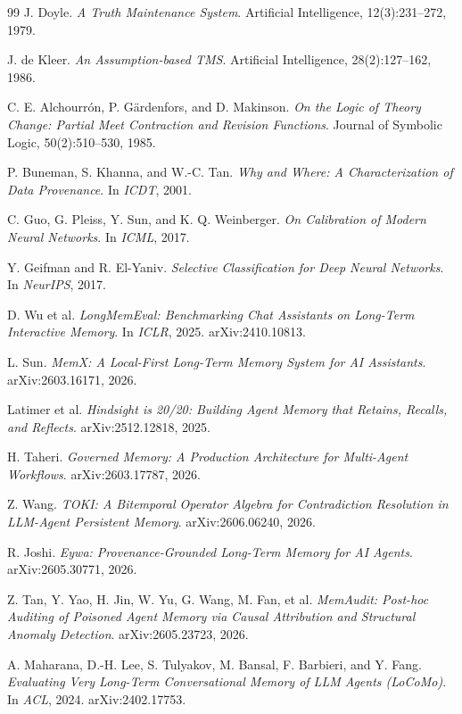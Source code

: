 \documentclass[11pt]{article}
\theoremstyle{definition}
\begin{document}
\begin{thebibliography}{99}
 J. Doyle. \emph{A Truth Maintenance System}. Artificial
Intelligence, 12(3):231--272, 1979.

 J. de Kleer. \emph{An Assumption-based TMS}. Artificial
Intelligence, 28(2):127--162, 1986.

 C. E. Alchourr\'on, P. G\"ardenfors, and D. Makinson. \emph{On the
Logic of Theory Change: Partial Meet Contraction and Revision Functions}.
Journal of Symbolic Logic, 50(2):510--530, 1985.

 P. Buneman, S. Khanna, and W.-C. Tan. \emph{Why and Where:
A Characterization of Data Provenance}. In \emph{ICDT}, 2001.

 C. Guo, G. Pleiss, Y. Sun, and K. Q. Weinberger. \emph{On
Calibration of Modern Neural Networks}. In \emph{ICML}, 2017.

 Y. Geifman and R. El-Yaniv. \emph{Selective Classification
for Deep Neural Networks}. In \emph{NeurIPS}, 2017.

 D. Wu et al. \emph{LongMemEval: Benchmarking Chat
Assistants on Long-Term Interactive Memory}. In \emph{ICLR}, 2025.
arXiv:2410.10813.

 L. Sun. \emph{MemX: A Local-First Long-Term Memory System for AI
Assistants}. arXiv:2603.16171, 2026.

 Latimer et al. \emph{Hindsight is 20/20: Building Agent
Memory that Retains, Recalls, and Reflects}. arXiv:2512.12818, 2025.

 H. Taheri. \emph{Governed Memory: A Production Architecture
for Multi-Agent Workflows}. arXiv:2603.17787, 2026.

 Z. Wang. \emph{TOKI: A Bitemporal Operator Algebra for
Contradiction Resolution in LLM-Agent Persistent Memory}. arXiv:2606.06240,
2026.

 R. Joshi. \emph{Eywa: Provenance-Grounded Long-Term Memory for
AI Agents}. arXiv:2605.30771, 2026.

 Z. Tan, Y. Yao, H. Jin, W. Yu, G. Wang, M. Fan, et al.
\emph{MemAudit: Post-hoc Auditing of Poisoned Agent Memory via Causal
Attribution and Structural Anomaly Detection}. arXiv:2605.23723, 2026.

 A. Maharana, D.-H. Lee, S. Tulyakov, M. Bansal, F. Barbieri,
and Y. Fang. \emph{Evaluating Very Long-Term Conversational Memory of LLM
Agents (LoCoMo)}. In \emph{ACL}, 2024. arXiv:2402.17753.

\end{thebibliography}
\end{document}
